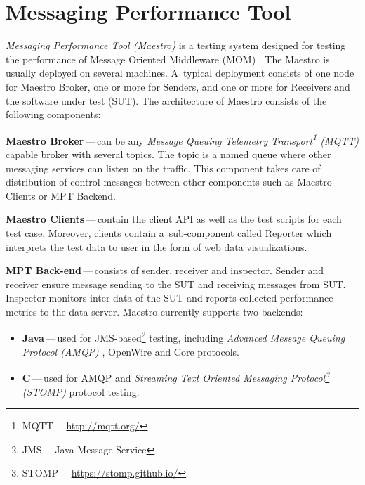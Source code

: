\documentclass{ExcelAtFIT}
\begin{document}
\section{Messaging Performance Tool}
\label{sec:MessagingPerformanceTool}

\emph{Messaging Performance Tool (Maestro)} \cite{ORPISKE:MSGPT} is a testing system designed for testing the performance of Message Oriented Middleware (MOM) \cite{CURRY:MOM}. The Maestro is usually deployed on several machines. A~typical deployment consists of one node for Maestro Broker, one or more for Senders, and one or more for Receivers and the software under test (SUT). The architecture of Maestro consists of the following components:

\begin{description}
	\item \textbf{Maestro Broker}\,---\,can be any \emph{Message Queuing Telemetry Transport\footnote{MQTT\,---\,\url{http://mqtt.org/}} (MQTT)} capable broker with several topics. The topic is a named queue where other messaging services can listen on the traffic. This component takes care of distribution of control messages between other components such as Maestro Clients or MPT Backend.
	\item \textbf{Maestro Clients}\,---\,contain the client API as well as the test scripts for each test case. Moreover, clients contain a~sub-component called Reporter which interprets the test data to user in the form of web data visualizations.
	\item \textbf{MPT Back-end}\,---\,consists of sender, receiver and inspector. Sender and receiver ensure message sending to the SUT and receiving messages from SUT. Inspector monitors inter data of the SUT and reports collected performance metrics to the data server. Maestro currently supports two backends:
	\begin{itemize}
		\item \textbf{Java}\,---\,used for JMS-based\footnote{JMS\,---\,Java Message Service} testing, including \emph{Advanced Message Queuing Protocol (AMQP)} \cite{OASIS:AMQP}, OpenWire and Core protocols.
		\item \textbf{C}\,---\,used for AMQP and \emph{Streaming Text Oriented Messaging Protocol\footnote{STOMP\,---\,\url{https://stomp.github.io/}} (STOMP)} protocol testing.
	\end{itemize}
\end{description}
\end{document}
